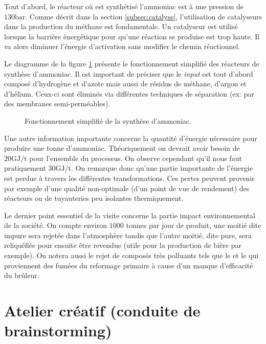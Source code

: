 \documentclass[a4paper, oneside, 12pt]{article}
\begin{document}
Tout d'abord, le réacteur où est synthétisé l'ammoniac est à une pression de $130 \si{\bar}$. Comme décrit dans la section \ref{subsec:catalyse}, l'utilisation de catalyseurs dans la production du méthane est fondamentale. Un catalyseur est utilisé lorsque la barrière énergétique pour qu'une réaction se produise est trop haute. Il va alors diminuer l'énergie d'activation sans modifier le chemin réactionnel.

Le diagramme de la figure \ref{fig:synthese} présente le fonctionnement simplifié des réacteurs de synthèse d'ammoniac. Il est important de préciser que le \emph{input} est tout d'abord composé d'hydrogène et d'azote mais aussi de résidus de méthane, d'argon et d'hélium. Ceux-ci sont éliminés via différentes techniques de séparation (ex: par 
des membranes semi-perméables). 

\begin{figure}[h!]
	\begin{center}
		
	\end{center}
	\caption{Fonctionnement simplifié de la synthèse d'ammoniac.}
	\label{fig:synthese}
\end{figure}

Une autre information importante concerne la quantité d'énergie nécessaire pour produire
une tonne d'ammoniac. Théoriquement on devrait avoir besoin de $20 \si{\giga\joule/\tonne}$
pour l'ensemble du processus. On observe cependant qu'il nous faut 
pratiquement $30 \si{\giga\joule/\tonne}$. On remarque donc qu'une partie 
importante de l'énergie est perdue à travers les différentes transformations. 
Ces pertes peuvent provenir par exemple d'une qualité non-optimale (d'un point de vue 
de rendement) des réacteurs ou de tuyauteries peu isolantes thermiquement.

Le dernier point essentiel de la visite concerne la partie impact environnemental 
de la société. On compte environ $1000$ tonnes par jour de  produit, une moitié
dite impure sera rejetée dans l'atmosphère tandis que l'autre moitié, dite pure, 
sera reliquéfiée pour ensuite être revendue (utile pour la production de bière par exemple).
On notera aussi le rejet de composés très polluants tels que le  et le  
qui proviennent des fumées du reformage primaire à cause d'un manque d'efficacité
du brûleur.

\section{Atelier créatif (conduite de brainstorming)}
\end{document}
